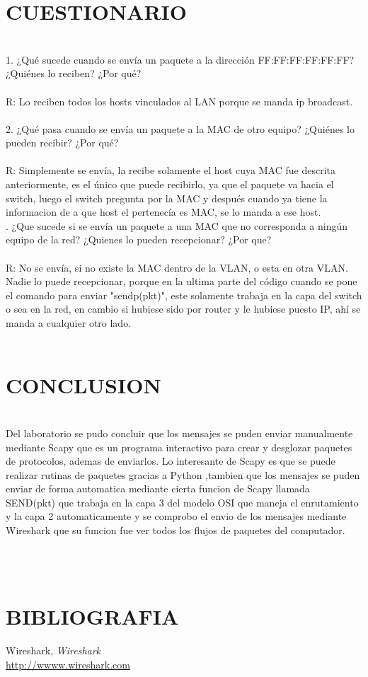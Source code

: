 \documentclass[onecolumn,12pt]{IEEEtran}
\begin{document}
\section{CUESTIONARIO}
\hfill \\
1.
¿Qué sucede cuando se envía un paquete a la dirección FF:FF:FF:FF:FF:FF? ¿Quiénes lo reciben?
¿Por qué?\\ \\
R: Lo reciben todos los hosts vinculados al LAN porque se manda ip broadcast.\\ \\
2.
¿Qué pasa cuando se envía un paquete a la MAC de otro equipo? ¿Quiénes lo pueden recibir? ¿Por
qué?\\ \\
R: Simplemente se envía, la recibe solamente el host cuya MAC fue descrita anteriormente, es el único que puede recibirlo, ya que el paquete va hacia el switch, luego el switch pregunta por la MAC y después cuando ya tiene la informacion de a que host el pertenecía es MAC, se lo manda a ese host.\\
.
¿Que sucede si se envía un paquete a una MAC que no corresponda a ningún equipo de la red? ¿Quienes
lo pueden recepcionar? ¿Por que?\\ \\
R: No se envía, si no existe la MAC dentro de la VLAN, o esta en otra VLAN. Nadie lo puede recepcionar, porque en la ultima parte del código cuando se pone el comando para enviar "sendp(pkt)", este solamente trabaja en la capa del switch o sea en la red, en cambio si hubiese sido por router y le hubiese puesto IP, ahí se manda a cualquier otro lado.\\ \\

\section{CONCLUSION}
\hfill \\

Del laboratorio se pudo concluir que los mensajes se puden enviar manualmente mediante Scapy que es un programa interactivo para crear y desglozar paquetes de protocolos, ademas de enviarlos. Lo interesante de Scapy es que  se puede realizar rutinas de paquetes gracias a Python ,tambien que los mensajes se puden enviar de forma automatica mediante cierta funcion de Scapy llamada SEND(pkt) que trabaja en la capa 3 del modelo OSI que maneja el enrutamiento y la capa 2 automaticamente  y se comprobo el envio de los mensajes mediante Wireshark que su funcion fue ver todos los flujos de paquetes del computador.

\hfill \\
\hfill \\
\section{BIBLIOGRAFIA}

Wireshark,
\emph{Wireshark} \\
\url{http://wwww.wireshark.com} \\
\end{document}
